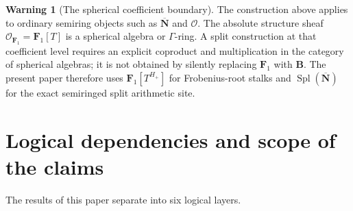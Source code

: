\documentclass[11pt]{amsart}
\numberwithin{equation}{section}
\theoremstyle{definition}
\newtheorem{warning}[theorem]{Warning}
\newcommand{\B}{\mathbf B}
\newcommand{\N}{\mathbf N}
\newcommand{\Fone}{\mathbf F_1}
\newcommand{\cO}{\mathcal O}
\newcommand{\Spl}{\operatorname{Spl}}
\newcommand{\Nbar}{\overline{\N}}
\begin{document}
\begin{warning}[The spherical coefficient boundary]
The construction above applies to ordinary semiring objects such as
$\Nbar$ and $\cO$.  The absolute structure sheaf
$\cO_{\Fone}=\Fone[T]$ is a spherical algebra or $\Gamma$-ring.  A split
construction at that coefficient level requires an explicit coproduct and
multiplication in the category of spherical algebras; it is not obtained by
silently replacing $\Fone$ with $\B$.  The present paper therefore uses
$\Fone[T^{H_+}]$ for Frobenius-root stalks and $\Spl(\Nbar)$ for the exact
semiringed split arithmetic site.
\end{warning}

\section{Logical dependencies and scope of the claims}
\label{sec:claim-boundaries}

The results of this paper separate into six logical layers.
\end{document}
